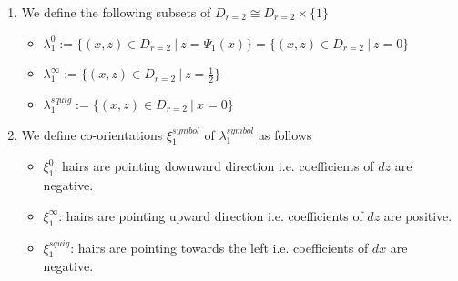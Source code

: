 \begin{definition}
\begin{enumerate}
\item We define the following subsets of $D_{r=2} \cong D_{r=2}\times \{1\}$
\begin{itemize}
\item $\lambda_1^0 := \{(x,z) \in D_{r=2} ~|~ z = \Psi_1(x)\}=\{(x,z) \in D_{r=2} ~|~ z = 0\}$

\item $\lambda_1^\infty:= \{(x,z) \in D_{r=2} ~|~ z = \frac{1}{2}\}$ 

\item $\lambda_1^{squig}:= \{(x,z) \in D_{r=2} ~|~ x = 0\}$ 
\end{itemize}

\item We define co-orientations $\xi_1^{symbol}$ of $\lambda_1^{symbol}$ as follows
\begin{itemize}
\item $\xi_1^0$: hairs are pointing downward direction i.e. coefficients of $dz$ are negative.

\item $\xi_1^\infty$: hairs are pointing upward direction i.e. coefficients of $dz$ are positive.

\item $\xi_1^{squig}$: hairs are pointing towards the left i.e. coefficients of $dx$ are negative.
\end{itemize}
\end{enumerate}
\end{definition}

